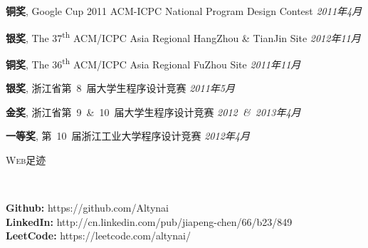 ﻿\documentclass[9pt]{article}
\newenvironment{changemargin}[2]{%
  \begin{list}{}{%
    \setlength{\topsep}{0pt}%
    \setlength{\leftmargin}{#1}%
    \setlength{\rightmargin}{#2}%
    \setlength{\listparindent}{\parindent}%
    \setlength{\itemindent}{\parindent}%
    \setlength{\parsep}{\parskip}%
  }%
  \item[]}{\end{list}
}
\newcommand{\lineover}{
	\begin{changemargin}{-0.05in}{-0.05in}
		\vspace*{-8pt}
		\hrulefill \\
		\vspace*{-2pt}
	\end{changemargin}
}
\newcommand{\header}[1]{
	\begin{changemargin}{-0.5in}{-0.5in}
		\scshape{#1}\\
  	\lineover
	\end{changemargin}
}
\newenvironment{body} {
	\vspace*{-16pt}
	\begin{changemargin}{-0.25in}{-0.5in}
  }	
	{\end{changemargin}
}
\newcommand\nth{\textsuperscript{th}} %
\begin{document}
\begin{body}
	\vspace{14pt}

	\textbf{铜奖}, Google Cup 2011 ACM-ICPC National Program Design Contest \hfill{} \emph{2011年4月}\\
	\smallskip

	\textbf{银奖}, The 37\nth{} ACM/ICPC Asia Regional HangZhou \& TianJin Site \hfill{} \emph{2012年11月}\\
	\smallskip

	\textbf{铜奖}, The 36\nth{} ACM/ICPC Asia Regional FuZhou Site \hfill{} \emph{2011年11月}\\
	\smallskip

	\textbf{银奖}, 浙江省第~8~届大学生程序设计竞赛 \hfill{} \emph{2011年5月}\\
	\smallskip

	\textbf{金奖}, 浙江省第~9~\&~10~届大学生程序设计竞赛 \hfill{} \emph{2012~\&~2013年4月}\\
	\smallskip

	\textbf{一等奖}, 第~10~届浙江工业大学程序设计竞赛 \hfill{} \emph{2012年4月}\\
\end{body}

\smallskip

\header{Web足迹}

\begin{body}
	\vspace{14pt}
    \textbf{Github:} https://github.com/Altynai \\
    \textbf{LinkedIn:} http://cn.linkedin.com/pub/jiapeng-chen/66/b23/849\\
    \textbf{LeetCode:} https://leetcode.com/altynai/ \\
\end{body}
\end{document}
